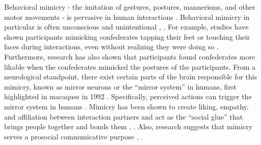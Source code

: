 \documentclass{acm_proc_article-sp}
\begin{document}
Behavioral mimicry - the imitation of gestures, postures, mannerisms, and other motor movements - is pervasive in human interactions \cite{chartrand2013antecedents}. Behavioral mimicry in particular is often unconscious and unintentional \cite{chartrand2005role}, \cite{white2011imitation}. For example, studies have shown participants mimicking confederates tapping their feet or touching their faces during interactions, even without realizing they were doing so \cite{chartrand1999chameleon}. Furthermore, research has also shown that participants found confederates more likable when the confederates mimicked the postures of the participants.
From a neurological standpoint, there exist certain parts of the brain responsible for this mimicry, known as mirror neurons or the ``mirror system'' in humans, first highlighted in macaques in 1992 \cite{ehrenfeld2011reflections}. Specifically, perceived actions can trigger the mirror system in humans \cite{chartrand1999chameleon}. Mimicry has been shown to create liking, empathy, and affiliation between interaction partners and act as the ``social glue'' that brings people together and bonds them \cite{chartrand2013antecedents}, \cite{lakin2003chameleon}. Also, research suggests that mimicry serves a prosocial communicative purpose \cite{bavelas1986show}, \cite{chartrand2013antecedents}.
\end{document}
